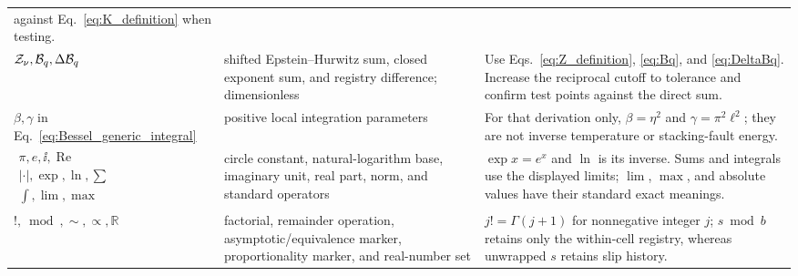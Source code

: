 \begin{longtable}{>{\raggedright\arraybackslash}p{}
                  >{\raggedright\arraybackslash}p{}
                  >{\raggedright\arraybackslash}p{}}
against Eq.~\eqref{eq:K_definition} when testing.\\
$\mathcal Z_\nu,\mathcal B_q,\Delta\mathcal B_q$ & shifted Epstein--Hurwitz sum, closed exponent sum, and registry
difference; dimensionless & Use Eqs.~\eqref{eq:Z_definition}, \eqref{eq:Bq}, and
\eqref{eq:DeltaBq}. Increase the reciprocal cutoff to tolerance and confirm test points against
the direct sum.\\
$\beta,\gamma$ in Eq.~\eqref{eq:Bessel_generic_integral} & positive local integration parameters &
For that derivation only, $\beta=\eta^2$ and $\gamma=\pi^2\ell^2$; they are not inverse temperature
or stacking-fault energy.\\
$\begin{gathered}\pi,e,\ii,\operatorname{Re}\\|\cdot|,\exp,\ln,\sum\\
\int,\lim,\max\end{gathered}$ & circle constant, natural-logarithm base, imaginary
unit, real part, norm, and standard operators & $\exp x=e^x$ and $\ln$ is its inverse. Sums and
integrals use the displayed limits; $\lim$, $\max$, and absolute values have their standard exact
meanings.\\
$!,\bmod,\sim,\propto,\mathbb R$ & factorial, remainder operation, asymptotic/equivalence marker,
proportionality marker, and real-number set & $j!=\Gamma(j+1)$ for nonnegative integer $j$;
$s\bmod b$ retains only the within-cell registry, whereas unwrapped $s$ retains slip history.\\
\end{longtable}

